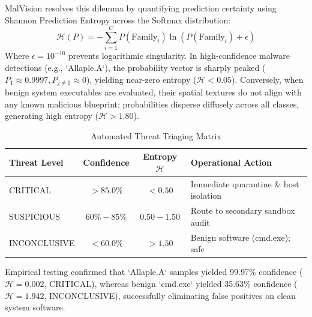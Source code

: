 \documentclass[journal,10pt,twocolumn]{IEEEtran}
\begin{document}
MalVision resolves this dilemma by quantifying prediction certainty using Shannon Prediction Entropy across the Softmax distribution:
\begin{equation}
\mathcal{H}(P) = -\sum_{i=1}^{C} P(\text{Family}_i) \ln\left(P(\text{Family}_i) + \epsilon\right)
\end{equation}
Where $\epsilon = 10^{-10}$ prevents logarithmic singularity. In high-confidence malware detections (e.g., `Allaple.A`), the probability vector is sharply peaked ($P_1 \approx 0.9997, P_{j \neq 1} \approx 0$), yielding near-zero entropy ($\mathcal{H} < 0.05$). Conversely, when benign system executables are evaluated, their spatial textures do not align with any known malicious blueprint; probabilities disperse diffusely across all classes, generating high entropy ($\mathcal{H} > 1.80$).

\begin{table}[!t]
\caption{Automated Threat Triaging Matrix\label{tab:triage}}
\centering
\begin{tabular}{lccl}
\toprule
\textbf{Threat Level} & \textbf{Confidence} & \textbf{Entropy $\mathcal{H}$} & \textbf{Operational Action} \\
\midrule
CRITICAL & $> 85.0\%$ & $< 0.50$ & Immediate quarantine \& host isolation \\
SUSPICIOUS & $60\% - 85\%$ & $0.50 - 1.50$ & Route to secondary sandbox audit \\
INCONCLUSIVE & $< 60.0\%$ & $> 1.50$ & Benign software (cmd.exe); safe \\
\bottomrule
\end{tabular}
\end{table}

Empirical testing confirmed that `Allaple.A` samples yielded 99.97\% confidence ($\mathcal{H} = 0.002$, CRITICAL), whereas benign `cmd.exe` yielded 35.63\% confidence ($\mathcal{H} = 1.942$, INCONCLUSIVE), successfully eliminating false positives on clean system software.
\end{document}
